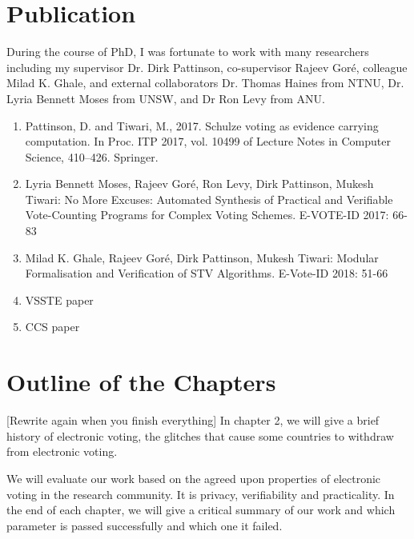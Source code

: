       
 
 
%
%  

	\section{Publication}
	During the course of PhD, I was fortunate to work with many researchers including my supervisor 
	Dr. Dirk Pattinson, co-supervisor Rajeev Goré, colleague Milad K. Ghale,  and external collaborators 
	Dr. Thomas Haines from NTNU, Dr. Lyria Bennett Moses from UNSW, and Dr Ron Levy from ANU.  
	\begin{enumerate}
	\item Pattinson, D. and Tiwari, M., 2017. Schulze voting as evidence carrying computation. In Proc. 
	ITP 2017, vol. 10499 of Lecture Notes in Computer Science, 410–426. Springer. 
	\item Lyria Bennett Moses, Rajeev Goré, Ron Levy, Dirk Pattinson, Mukesh Tiwari:
	No More Excuses: Automated Synthesis of Practical and Verifiable Vote-Counting Programs for Complex 
	Voting 	Schemes. E-VOTE-ID 2017: 66-83
	\item Milad K. Ghale, Rajeev Goré, Dirk Pattinson, Mukesh Tiwari:
	Modular Formalisation and Verification of STV Algorithms. E-Vote-ID 2018: 51-66
	\item VSSTE paper
	\item CCS paper

	\end{enumerate}
		
	

\section{Outline of the Chapters}
[Rewrite again when you finish everything]
In chapter 2, we will give a brief history of electronic voting, the glitches that cause some countries 
to withdraw from electronic voting.  



We will evaluate our work based on the agreed upon properties of electronic voting in 
the research community.  It is privacy, verifiability and practicality. In the end of each chapter, 
we will give a critical summary of  our work and which parameter is passed successfully and which 
one it failed. 



